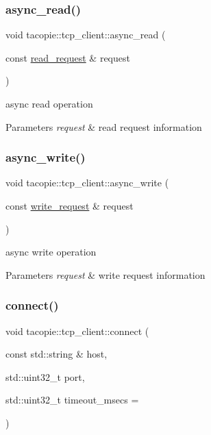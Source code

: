 \subsubsection{\texorpdfstring{async\+\_\+read()}{async\_read()}}
{\footnotesize\ttfamily void tacopie\+::tcp\+\_\+client\+::async\+\_\+read (\begin{DoxyParamCaption}\item[{const \hyperlink{structtacopie_1_1tcp__client_1_1read__request}{read\+\_\+request} \&}]{request }\end{DoxyParamCaption})}

async read operation


\begin{DoxyParams}{Parameters}
{\em request} & read request information \\
\hline
\end{DoxyParams}
\mbox{\label{classtacopie_1_1tcp__client_a2304ed6d4ca0cbc74e6aa72d3e92b76a}} 
\subsubsection{\texorpdfstring{async\+\_\+write()}{async\_write()}}
{\footnotesize\ttfamily void tacopie\+::tcp\+\_\+client\+::async\+\_\+write (\begin{DoxyParamCaption}\item[{const \hyperlink{structtacopie_1_1tcp__client_1_1write__request}{write\+\_\+request} \&}]{request }\end{DoxyParamCaption})}

async write operation


\begin{DoxyParams}{Parameters}
{\em request} & write request information \\
\hline
\end{DoxyParams}
\mbox{\label{classtacopie_1_1tcp__client_a0cfbb18cb72aa3b6a41921f61cacc425}} 
\subsubsection{\texorpdfstring{connect()}{connect()}}
{\footnotesize\ttfamily void tacopie\+::tcp\+\_\+client\+::connect (\begin{DoxyParamCaption}\item[{const std\+::string \&}]{host,  }\item[{std\+::uint32\+\_\+t}]{port,  }\item[{std\+::uint32\+\_\+t}]{timeout\+\_\+msecs = {} }\end{DoxyParamCaption})}

